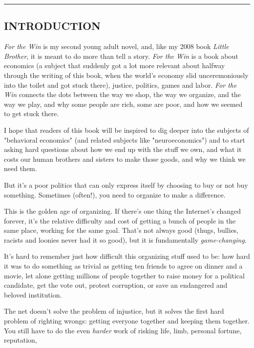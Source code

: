 \begin{center}\rule{3in}{0.4pt}\end{center}

\subsection{INTRODUCTION}

\emph{For the Win} is my second young adult novel, and, like my
2008 book \emph{Little Brother}, it is meant to do more than tell a
story. \emph{For the Win} is a book about economics (a subject that
suddenly got a lot more relevant about halfway through the writing
of this book, when the world's economy slid unceremoniously into
the toilet and got stuck there), justice, politics, games and
labor. \emph{For the Win} connects the dots between the way we
shop, the way we organize, and the way we play, and why some people
are rich, some are poor, and how we seemed to get stuck there.

I hope that readers of this book will be inspired to dig deeper
into the subjects of "behavioral economics" (and related subjects
like "neuroeconomics") and to start asking hard questions about how
we end up with the stuff we own, and what it costs our human
brothers and sisters to make those goods, and why we think we need
them.

But it's a poor politics that can only express itself by choosing
to buy or not buy something. Sometimes (often!), you need to
organize to make a difference.

This is the golden age of organizing. If there's one thing the
Internet's changed forever, it's the relative difficulty and cost
of getting a bunch of people in the same place, working for the
same goal. That's not always good (thugs, bullies, racists and
loonies never had it so good), but it is fundamentally
\emph{game-changing}.

It's hard to remember just how difficult this organizing stuff used
to be: how hard it was to do something as trivial as getting ten
friends to agree on dinner and a movie, let alone getting millions
of people together to raise money for a political candidate, get
the vote out, protest corruption, or save an endangered and beloved
institution.

The net doesn't solve the problem of injustice, but it solves the
first hard problem of righting wrongs: getting everyone together
and keeping them together. You still have to do the even
\emph{harder} work of risking life, limb, personal fortune,
reputation,

